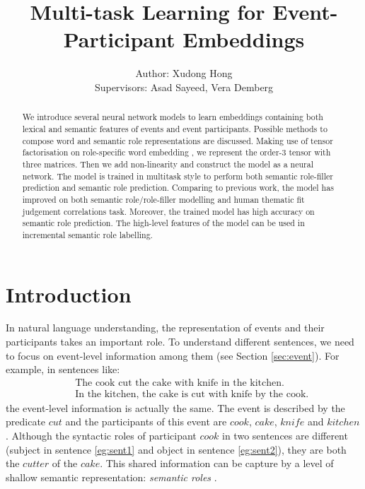 \documentclass[a4paper]{article}
\title{Multi-task Learning for Event-Participant Embeddings}
\author{Author: Xudong Hong \\ 
Supervisors: Asad Sayeed, Vera Demberg}
\begin{document}
\maketitle


\begin{abstract}
\noindent
We introduce several neural network models to learn embeddings containing both lexical and semantic features of events and event participants. Possible methods to compose word and semantic role representations are discussed. Making use of tensor factorisation on role-specific word embedding \citep{tilk2016event}, we represent the order-3 tensor with three matrices. Then we add non-linearity and construct the model as a neural network. The model is trained in multitask style to perform both semantic role-filler prediction and semantic role prediction. Comparing to previous work, the model has improved on both semantic role/role-filler modelling and human thematic fit judgement correlations task. Moreover, the trained model has high accuracy on semantic role prediction. The high-level features of the model can be used in incremental semantic role labelling.  
\end{abstract}



\section{Introduction} \label{sec:intro}
In natural language understanding, the representation of events and their participants takes an important role. To understand different sentences, we need to focus on event-level information among them  (see Section \ref{sec:event}). For example, in sentences like: 
\begin{eqnarray}
    & &\text{The cook cut the cake with knife in the kitchen.}        \label{eg:sent1} \\   
    & &\text{In the kitchen, the cake is cut with knife by the cook.} \label{eg:sent2}
\end{eqnarray}
the event-level information is actually the same. The event is described by the predicate $cut$ and the participants of this event are $cook$, $cake$, $knife$ and $kitchen$. Although the syntactic roles of participant $cook$ in two sentences are different (subject in sentence \eqref{eg:sent1} and object in sentence \eqref{eg:sent2}), they are both the $cutter$ of the $cake$. This shared information can be capture by a level of shallow semantic representation: \textit{semantic roles} \citep{jurafsky2014speech}. 
\end{document}

